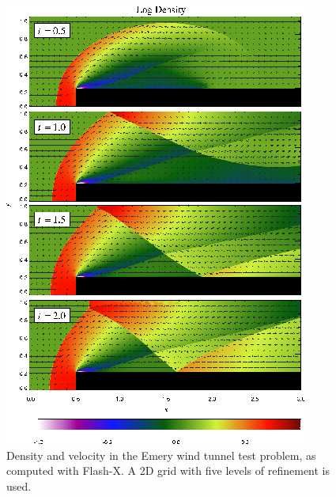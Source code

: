 \begin{figure}
\begin{center}
\includegraphics{WindTunnel_a} %
\caption{\label{Fig:Wind tunnel} Density and velocity in the Emery
wind tunnel test problem, as computed with Flash-X. A 2D grid with five
levels of refinement is used.
}
\end{center}
\end{figure}

